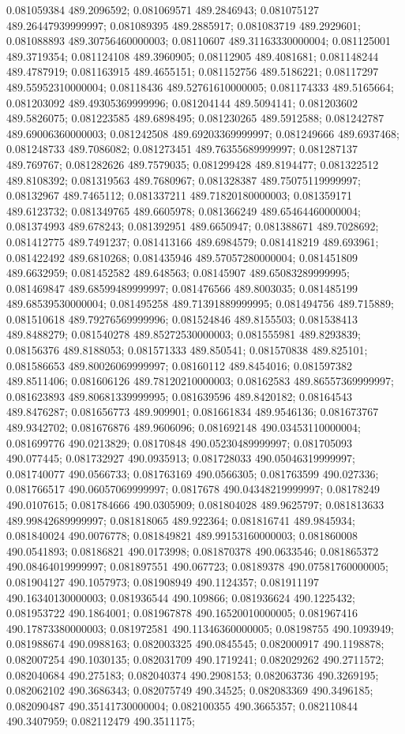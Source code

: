 0.081059384 489.2096592; 0.081069571 489.2846943; 0.081075127 489.26447939999997; 0.081089395 489.2885917; 0.081083719 489.2929601; 0.081088893 489.30756460000003; 0.08110607 489.31163330000004; 0.081125001 489.3719354; 0.081124108 489.3960905; 0.08112905 489.4081681; 0.081148244 489.4787919; 0.081163915 489.4655151; 0.081152756 489.5186221; 0.08117297 489.55952310000004; 0.08118436 489.52761610000005; 0.081174333 489.5165664; 0.081203092 489.49305369999996; 0.081204144 489.5094141; 0.081203602 489.5826075; 0.081223585 489.6898495; 0.081230265 489.5912588; 0.081242787 489.69006360000003; 0.081242508 489.69203369999997; 0.081249666 489.6937468; 0.081248733 489.7086082; 0.081273451 489.76355689999997; 0.081287137 489.769767; 0.081282626 489.7579035; 0.081299428 489.8194477; 0.081322512 489.8108392; 0.081319563 489.7680967; 0.081328387 489.75075119999997; 0.08132967 489.7465112; 0.081337211 489.71820180000003; 0.081359171 489.6123732; 0.081349765 489.6605978; 0.081366249 489.65464460000004; 0.081374993 489.678243; 0.081392951 489.6650947; 0.081388671 489.7028692; 0.081412775 489.7491237; 0.081413166 489.6984579; 0.081418219 489.693961; 0.081422492 489.6810268; 0.081435946 489.57057280000004; 0.081451809 489.6632959; 0.081452582 489.648563; 0.08145907 489.65083289999995; 0.081469847 489.68599489999997; 0.081476566 489.8003035; 0.081485199 489.68539530000004; 0.081495258 489.71391889999995; 0.081494756 489.715889; 0.081510618 489.79276569999996; 0.081524846 489.8155503; 0.081538413 489.8488279; 0.081540278 489.85272530000003; 0.081555981 489.8293839; 0.08156376 489.8188053; 0.081571333 489.850541; 0.081570838 489.825101; 0.081586653 489.80026069999997; 0.08160112 489.8454016; 0.081597382 489.8511406; 0.081606126 489.78120210000003; 0.08162583 489.86557369999997; 0.081623893 489.80681339999995; 0.081639596 489.8420182; 0.08164543 489.8476287; 0.081656773 489.909901; 0.081661834 489.9546136; 0.081673767 489.9342702; 0.081676876 489.9606096; 0.081692148 490.03453110000004; 0.081699776 490.0213829; 0.08170848 490.05230489999997; 0.081705093 490.077445; 0.081732927 490.0935913; 0.081728033 490.05046319999997; 0.081740077 490.0566733; 0.081763169 490.0566305; 0.081763599 490.027336; 0.081766517 490.06057069999997; 0.0817678 490.04348219999997; 0.08178249 490.0107615; 0.081784666 490.0305909; 0.081804028 489.9625797; 0.081813633 489.99842689999997; 0.081818065 489.922364; 0.081816741 489.9845934; 0.081840024 490.0076778; 0.081849821 489.99153160000003; 0.081860008 490.0541893; 0.08186821 490.0173998; 0.081870378 490.0633546; 0.081865372 490.08464019999997; 0.081897551 490.067723; 0.08189378 490.07581760000005; 0.081904127 490.1057973; 0.081908949 490.1124357; 0.081911197 490.16340130000003; 0.081936544 490.109866; 0.081936624 490.1225432; 0.081953722 490.1864001; 0.081967878 490.16520010000005; 0.081967416 490.17873380000003; 0.081972581 490.11346360000005; 0.08198755 490.1093949; 0.081988674 490.0988163; 0.082003325 490.0845545; 0.082000917 490.1198878; 0.082007254 490.1030135; 0.082031709 490.1719241; 0.082029262 490.2711572; 0.082040684 490.275183; 0.082040374 490.2908153; 0.082063736 490.3269195; 0.082062102 490.3686343; 0.082075749 490.34525; 0.082083369 490.3496185; 0.082090487 490.35141730000004; 0.082100355 490.3665357; 0.082110844 490.3407959; 0.082112479 490.3511175; 
